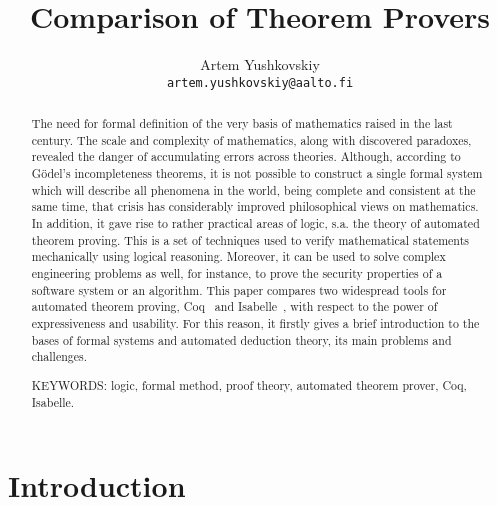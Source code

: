 \documentclass[article]{aaltoseries}
\begin{document}

\title{Comparison of Theorem Provers}

\author{Artem Yushkovskiy
\\\textnormal{\texttt{artem.yushkovskiy@aalto.fi}}}


\maketitle



\begin{abstract}

The need for formal definition of the very basis of mathematics raised in the last century.
The scale and complexity of mathematics, along with discovered paradoxes, revealed the danger of accumulating errors across theories. Although, according to Gödel's incompleteness theorems, it is not possible to construct a single formal system which will describe all phenomena in the world, being complete and consistent at the same time, that crisis has considerably improved philosophical views on mathematics. 
In addition, it gave rise to rather practical areas of logic, s.a. the theory of automated theorem proving. This is a set of techniques used to verify mathematical statements mechanically using logical reasoning. Moreover, it can be used to solve complex engineering problems as well, for instance, to prove the security properties of a software system or an algorithm.
This paper compares two widespread tools for automated theorem proving, Coq~\cite{tool_Coq} and Isabelle~\cite{tool_Isabelle}, with respect to the power of expressiveness and usability. For this reason, it firstly gives a brief introduction to the bases of formal systems and automated deduction theory, its main problems and challenges.

\vspace{3mm}
\noindent KEYWORDS: logic, formal method, proof theory, automated theorem prover, Coq, Isabelle.
	
\end{abstract}



\section{Introduction}
\end{document}
